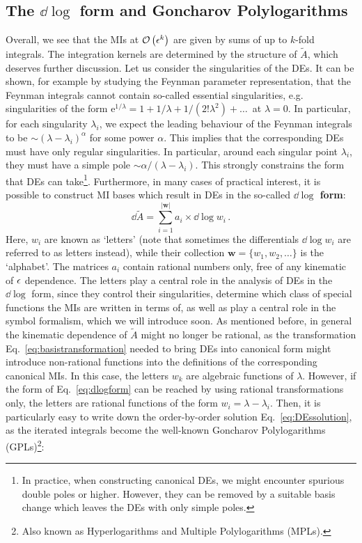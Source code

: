 \documentclass[main.tex]{subfiles}
\begin{document}
\subsection{The $\dd \log$ form and Goncharov Polylogarithms} \label{sec:DEdlogform}
Overall, we see that the MIs at $\mathcal{O}\left(\epsilon^k\right)$ are given by sums of up to $k$-fold integrals. The integration kernels are determined by the structure of $\tilde{A}$, which deserves further discussion. Let us consider the singularities of the DEs. It can be shown, for example by studying the Feynman parameter representation, that the Feynman integrals cannot contain so-called essential singularities, e.g. singularities of the form $\mathrm{e}^{1/\lambda} = 1+ 1/\lambda + 1/(2!\lambda^2)+\ldots\,$ at $\lambda=0$. In particular, for each singularity $\lambda_i$, we expect the leading behaviour of the Feynman integrals to be $\sim (\lambda- \lambda_i)^\alpha$ for some power $\alpha$. This implies that the corresponding DEs must have only regular singularities. In particular, around each singular point $\lambda_i$, they must have a simple pole $\sim \alpha/(\lambda-\lambda_i)$. This strongly constrains the form that DEs can take\footnote{In practice, when constructing canonical DEs, we might encounter spurious double poles or higher. However, they can be removed by a suitable basis change which leaves the DEs with only simple poles. }\cite{Henn:2014qga}. Furthermore, in many cases of practical interest, it is possible to construct MI bases which result in DEs in the so-called \textbf{$\dd \log$ form}:
\begin{equation} \label{eq:dlogform}
    \dd\tilde{A} = \sum_{i=1}^{|\bm{w}|} a_i \times \dd \log w_i\,.
\end{equation}
Here, $w_i$ are known as `letters' (note that sometimes the differentials $\dd \log w_i$ are referred to as letters instead), while their collection $\bm{w} = \{w_1, w_2, \ldots\}$ is the `alphabet'. The matrices $a_i$ contain rational numbers only, free of any kinematic of $\epsilon$ dependence. The letters play a central role in the analysis of DEs in the $\dd \log$ form, since they control their singularities, determine which class of special functions the MIs are written in terms of, as well as play a central role in the symbol formalism, which we will introduce soon. As mentioned before, in general the kinematic dependence of $\tilde{A}$ might no longer be rational, as the transformation Eq.~\ref{eq:basistransformation} needed to bring DEs into canonical form might introduce non-rational functions into the definitions of the corresponding canonical MIs. In this case, the letters $w_k$ are algebraic functions of $\lambda$. However, if the form of Eq.~\ref{eq:dlogform} can be reached by using rational transformations only, the letters are rational functions of the form $w_i = \lambda - \lambda_i$. Then, it is particularly easy to write down the order-by-order solution Eq.~\ref{eq:DEssolution}, as the iterated integrals become the well-known Goncharov Polylogarithms (GPLs)\footnote{Also known as Hyperlogarithms and Multiple Polylogarithms (MPLs).}\cite{2001math......3059G, 2011arXiv1105.2076G, Vollinga:2004sn}:
\end{document}
